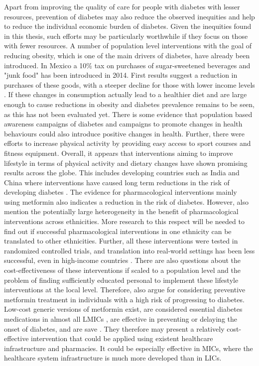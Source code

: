 Apart from improving the quality of care for people with diabetes with lesser resources, prevention of diabetes may also reduce the observed inequities and help to reduce the individual economic burden of diabetes. Given the inequities found in this thesis, such efforts may be particularly worthwhile if they focus on those with fewer resources. A number of population level interventions with the goal of reducing obesity, which is one of the main drivers of diabetes, have already been introduced. In Mexico a 10\% tax on purchases of sugar-sweetened beverages and "junk food" has been introduced in 2014. First results suggest a reduction in purchases of these goods, with a steeper decline for those with lower income levels \parencite{Colchero2016,Batis2016}. If these changes in consumption actually lead to a healthier diet and are large enough to cause reductions in obesity and diabetes prevalence remains to be seen, as this has not been evaluated yet. There is some evidence that population based awareness campaigns of diabetes and campaigns to promote changes in health behaviours could also introduce positive changes in health. Further, there were efforts to increase physical activity by providing easy access to sport courses and fitness equipment. Overall, it appears that interventions aiming to improve lifestyle in terms of physical activity and dietary changes have shown promising results across the globe. This includes developing countries such as India and China where interventions have caused long term reductions in the risk of developing diabetes \parencite{Cefalu2016}. The evidence for pharmacological interventions mainly using metformin also indicates a reduction in the risk of diabetes. However, \textcite{Cefalu2016} also mention the potentially large heterogeneity in the benefit of pharmacological interventions across ethnicities. More research to this respect will be needed to find out if successful pharmacological interventions in one ethnicity can be translated to other ethnicities. Further, all these interventions were tested in randomized controlled trials, and translation into real-world settings has been less successful, even in high-income countries \parencite{Wareham2016}. There are also questions about the cost-effectiveness of these interventions if scaled to a population level and the problem of finding sufficiently educated personal to implement these lifestyle interventions at the local level. Therefore, \textcite{Cefalu2016} also argue for considering preventive metformin treatment in individuals with a high risk of progressing to diabetes. Low-cost generic versions of metformin exist, are considered essential diabetes medications in almost all \acp{LMIC} \parencite{Bazargani2014}, are effective in preventing or delaying the onset of diabetes, and are save \parencite{Gomes2013}. They therefore may present a relatively cost-effective intervention that could be applied using existent healthcare infrastructure and pharmacies. It could be especially effective in \acp{MIC}, where the healthcare system infrastructure is much more developed than in \acp{LIC}.

